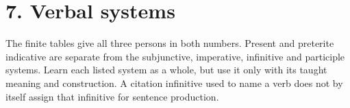 \section*{7. Verbal systems}

The finite tables give all three persons in both numbers. Present and preterite indicative are separate from the subjunctive, imperative, infinitive and participle systems. Learn each listed system as a whole, but use it only with its taught meaning and construction. A citation infinitive used to name a verb does not by itself assign that infinitive for sentence production.

\par\begingroup
\fontsize{10.5}{13.2}\selectfont
\setlength{\LTleft}{0pt}\setlength{\LTright}{\fill}
